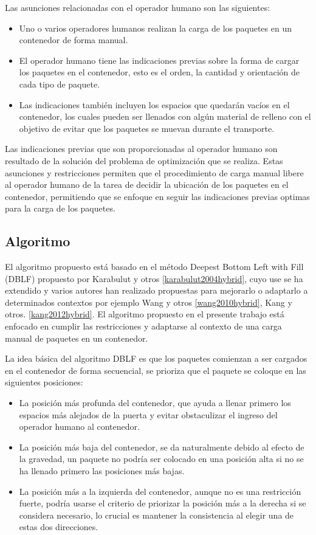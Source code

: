 Las asunciones relacionadas con el operador humano son las siguientes:

\begin{itemize}
    \item Uno o varios operadores humanos realizan la carga de los paquetes en un contenedor de forma manual.
    \item El operador humano tiene las indicaciones previas sobre la forma de cargar los paquetes en el contenedor, esto es el orden, la cantidad y orientación de cada tipo de paquete.
    \item Las indicaciones también incluyen los espacios que quedarán vacíos en el contenedor, los cuales pueden ser llenados con algún material de relleno con el objetivo de evitar que los paquetes se muevan durante el transporte.
\end{itemize}

Las indicaciones previas que son proporcionadas al operador humano son resultado de la solución del problema de optimización que se realiza. Estas asunciones y restricciones permiten que el procedimiento de carga manual libere al operador humano de la tarea de decidir la ubicación de los paquetes en el contenedor, permitiendo que se enfoque en seguir las indicaciones previas optimas para la carga de los paquetes.

\subsection{Algoritmo}

El algoritmo propuesto está basado en el método Deepest Bottom Left with Fill (DBLF) propuesto por Karabulut y otros \ref{karabulut2004hybrid}, cuyo use se ha extendido y varios autores han realizado propuestas para mejorarlo o adaptarlo a determinados contextos por ejemplo Wang y otros \ref{wang2010hybrid}, Kang y otros. \ref{kang2012hybrid}. El algoritmo propuesto en el presente trabajo está enfocado en cumplir las restricciones y adaptarse al contexto de una carga manual de paquetes en un contenedor.

La idea básica del algoritmo DBLF es que los paquetes comienzan a ser cargados en el contenedor de forma secuencial, se prioriza que el paquete se coloque en las siguientes posiciones: 

\begin{itemize}
    \item La posición más profunda del contenedor, que ayuda a llenar primero los espacios más alejados de la puerta y evitar obstaculizar el ingreso del operador humano al contenedor.
    \item La posición más baja del contenedor, se da naturalmente debido al efecto de la gravedad, un paquete no podría ser colocado en una posición alta si no se ha llenado primero las posiciones más bajas.
    \item La posición más a la izquierda del contenedor, aunque no es una restricción fuerte, podría usarse el criterio de priorizar la posición más a la derecha si se considera necesario, lo crucial es mantener la consistencia al elegir una de estas dos direcciones.
\end{itemize}

